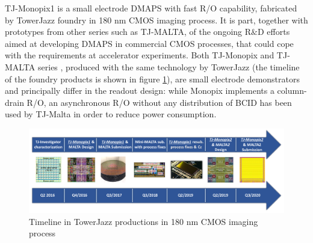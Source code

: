 
TJ-Monopix1 is a small electrode DMAPS with fast R/O capability, fabricated by TowerJazz foundry in 180 nm CMOS imaging process.
It is part, together with prototypes from other series such as TJ-MALTA, of the ongoing R$\&$D efforts aimed at developing DMAPS in commercial CMOS processes, that could cope with the requirements at accelerator experiments.
Both TJ-Monopix and TJ-MALTA series \cite{MALTA}, produced with the same technology by TowerJazz (the timeline of the foundry products is shown in figure \ref{fig:TJ180nm}), are small electrode demonstrators and principally differ in the readout design: while Monopix implements a column-drain R/O, an asynchronous R/O without any distribution of BCID has been used by TJ-Malta in order to reduce power consumption.

\begin{figure}[h!]
    \centering
    \includegraphics[width=.95\linewidth]{figures/Monopix1/TJ180nm.png}
    \caption{Timeline in TowerJazz productions in 180 nm CMOS imaging process}
    \label{fig:TJ180nm}
\end{figure} 

